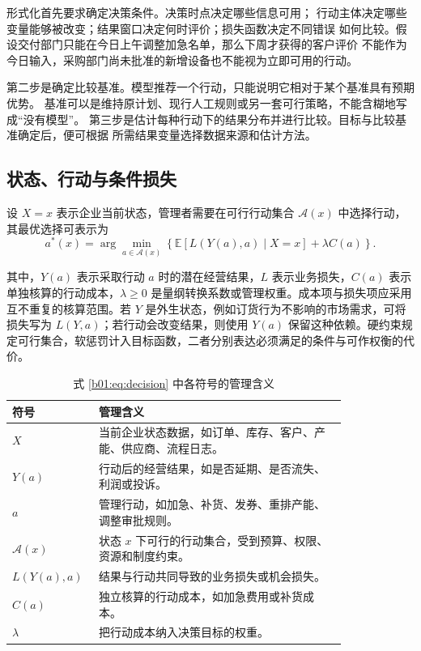 形式化首先要求确定决策条件。决策时点决定哪些信息可用；
行动主体决定哪些变量能够被改变；结果窗口决定何时评价；损失函数决定不同错误
如何比较。假设交付部门只能在今日上午调整加急名单，那么下周才获得的客户评价
不能作为今日输入，采购部门尚未批准的新增设备也不能视为立即可用的行动。

第二步是确定比较基准。模型推荐一个行动，只能说明它相对于某个基准具有预期优势。
基准可以是维持原计划、现行人工规则或另一套可行策略，不能含糊地写成“没有模型”。
第三步是估计每种行动下的结果分布并进行比较。目标与比较基准确定后，便可根据
所需结果变量选择数据来源和估计方法。

\subsection{状态、行动与条件损失}

设 \(X=x\) 表示企业当前状态，管理者需要在可行行动集合 \(\mathcal A(x)\) 中选择行动，其最优选择可表示为
\begin{equation}
a^*(x)
=
\arg\min_{a\in\mathcal A(x)}
\left\{\mathbb E\!\left[L(Y(a),a)\mid X=x\right]
+
\lambda C(a)\right\}.
\label{b01:eq:decision}
\end{equation}

其中，\(Y(a)\) 表示采取行动 \(a\) 时的潜在经营结果，\(L\) 表示业务损失，\(C(a)\) 表示单独核算的行动成本，\(\lambda\ge0\) 是量纲转换系数或管理权重。成本项与损失项应采用互不重复的核算范围。若 \(Y\) 是外生状态，例如订货行为不影响的市场需求，可将损失写为 \(L(Y,a)\)；若行动会改变结果，则使用 \(Y(a)\) 保留这种依赖。硬约束规定可行集合，软惩罚计入目标函数，二者分别表达必须满足的条件与可作权衡的代价。

\begin{table}[htbp]
\centering
\caption{式 \eqref{b01:eq:decision} 中各符号的管理含义}
\begin{tabular}{P{0.14\linewidth}P{0.68\linewidth}}
\toprule
{}
符号 & 管理含义\\
\midrule
\(X\) & 当前企业状态数据，如订单、库存、客户、产能、供应商、流程日志。\\
\(Y(a)\) & 行动后的经营结果，如是否延期、是否流失、利润或投诉。\\
\(a\) & 管理行动，如加急、补货、发券、重排产能、调整审批规则。\\
\(\mathcal A(x)\) & 状态 \(x\) 下可行的行动集合，受到预算、权限、资源和制度约束。\\
\(L(Y(a),a)\) & 结果与行动共同导致的业务损失或机会损失。\\
\(C(a)\) & 独立核算的行动成本，如加急费用或补货成本。\\
\(\lambda\) & 把行动成本纳入决策目标的权重。\\
\bottomrule
\end{tabular}
\end{table}

